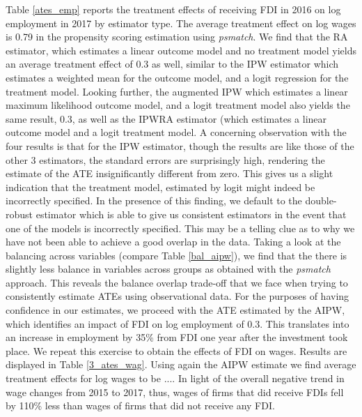 Table \ref{ates_emp} reports the treatment effects of receiving FDI in 2016 on log employment in 2017 by estimator type. The average treatment effect on log wages is 0.79 in the propensity scoring estimation using \textit{psmatch}. We find that the RA estimator, which estimates a linear outcome model and no treatment model yields an average treatment effect of 0.3 as well, similar to the IPW estimator which estimates a weighted mean for the outcome model, and a logit regression for the treatment model. Looking further, the augmented IPW which estimates a linear maximum likelihood outcome model, and a logit treatment model also yields the same result, 0.3, as well as the IPWRA estimator (which estimates a linear outcome model and a logit treatment model. A concerning observation with the four results is that for the IPW estimator, though the results are like those of the other 3 estimators, the standard errors are surprisingly high, rendering the estimate of the ATE insignificantly different from zero. This gives us a slight indication that the treatment model, estimated by logit might indeed be incorrectly specified. In the presence of this finding, we default to the double-robust estimator which is able to give us consistent estimators in the event that one of the models is incorrectly specified. This may be a telling clue as to why we have not been able to achieve a good overlap in the data. Taking a look at the balancing across variables (compare Table \ref{bal_aipw}), we find that the there is slightly less balance in variables across groups as obtained with the \textit{psmatch} approach. This reveals the balance overlap trade-off that we face when trying to consistently estimate ATEs using observational data. For the purposes of having confidence in our estimates, we proceed with the ATE estimated by the AIPW, which identifies an impact of FDI on log employment of 0.3. This translates into an increase in employment by 35\% from FDI one year after the investment took place. We repeat this exercise to obtain the effects of FDI on wages. Results are displayed in Table \ref{3_ates_wag}. Using again the AIPW estimate we find average treatment effects for log wages to be .... In light of the overall negative trend in wage changes from 2015 to 2017, thus, wages of firms that did receive FDIs fell by 110\% less than wages of firms that did not receive any FDI.




